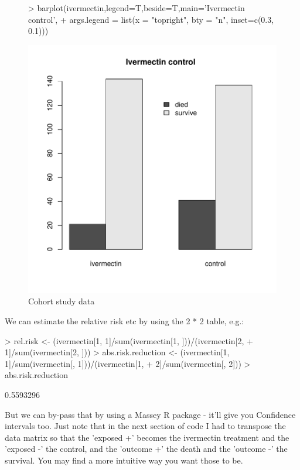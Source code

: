 \documentclass{article}
\begin{document}
\begin{figure}
\begin{Schunk}
\begin{Sinput}
> barplot(ivermectin,legend=T,beside=T,main='Ivermectin control',
+          args.legend = list(x = "topright", bty = "n", inset=c(0.3, 0.1)))
\end{Sinput}
\end{Schunk}
\includegraphics{Fig-test3}
\caption{Cohort study data}
\label{fig:p}
\end{figure}

We can estimate the relative risk etc by using the 2 * 2 table, e.g.:

\begin{Schunk}
\begin{Sinput}
> rel.risk <- (ivermectin[1, 1]/sum(ivermectin[1, ]))/(ivermectin[2, 
+     1]/sum(ivermectin[2, ]))
> abs.risk.reduction <- (ivermectin[1, 1]/sum(ivermectin[, 1]))/(ivermectin[1, 
+     2]/sum(ivermectin[, 2]))
> abs.risk.reduction
\end{Sinput}
\begin{Soutput}
[1] 0.5593296
\end{Soutput}
\end{Schunk}

But we can by-pass that by using a Massey R package - it'll give you Confidence intervals too. Just note that in the next section of code I had to transpose the data matrix so that the 'exposed +' becomes the ivermectin treatment and the 'exposed -' the control, and the 'outcome +' the death and the 'outcome -' the survival. You may find a more intuitive way you want those to be.
\end{document}
